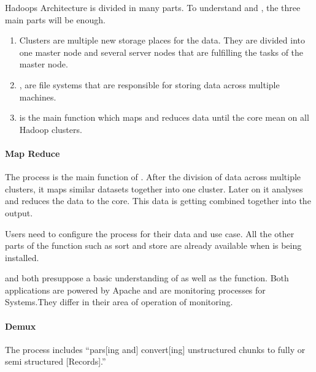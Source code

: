 Hadoops Architecture is divided in many parts. To understand \amb and \chuk, the three main parts will be enough.\cite{Dagli2014}
  \begin{enumerate}
  	\item \hadoop Clusters are multiple new storage places for the data. They are divided into one master node and several server nodes that are fulfilling the tasks of the master node.\cite{Dagli2014}
  	\item \hdfs, are file systems that are responsible for storing data across multiple machines.\cite{Dagli2014}
  	\item \mr is the main function which maps and reduces data until the core mean on all Hadoop clusters.\cite{Dagli2014}
  \end{enumerate}

\paragraph{Map Reduce}
The \mrlong process is the main function of \hadoop. After the division of data across multiple clusters, it maps similar datasets together into one cluster. 
Later on it analyses and reduces the data to the core. This data is getting combined together into the output. \cite{Dagli2014}

\hadoop Users need to configure the process for their data and use case. All the other parts of the function such as sort and store are already available when \hadoop is being installed.\cite{Dagli2014}


\amb and \chuk both presuppose a basic understanding of \hadoop as well as the \mr function. Both applications are powered by Apache and are monitoring processes for \hadoop Systems.They differ in their area of operation of monitoring.\cite{ApacheSoftwareFoundation2015}

\paragraph{Demux}
The \demux process includes ``pars[ing and]  convert[ing]  unstructured  chunks  to  fully  or  semi  structured [Records].''~\cite{Boulon}